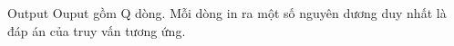 Output
Ouput gồm Q dòng. Mỗi dòng in ra một số nguyên dương duy nhất là đáp án của truy vấn tương ứng.